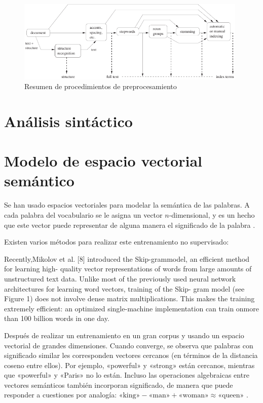 \begin{figure}[H]
\includegraphics[width=0.98\textwidth]{procesamiento-textos-mod-ir}
\caption[Resumen de procedimientos de preprocesamiento]{Resumen de procedimientos de preprocesamiento \citep[ch. 7]{Baeza-Yates2011}}
\end{figure}

\section{Análisis sintáctico}

\section{Modelo de espacio vectorial semántico}

Se han usado espacios vectoriales para modelar la semántica de las palabras. A cada palabra del vocabulario se le asigna un vector $n$-dimensional, y es un hecho que este vector puede representar de alguna manera el significado de la palabra \citep{Socher2012}.

Existen varios métodos para realizar este entrenamiento no supervisado:
\begin{description}
\item[]
\end{description}
Recently,Mikolov et al. [8] introduced the Skip-grammodel, an efficient method for learning high- quality vector representations of words from large amounts of unstructured text data. Unlike most of the previously used neural network architectures for learning word vectors, training of the Skip- gram model (see Figure 1) does not involve dense matrix multiplications. This makes the training extremely efficient: an optimized single-machine implementation can train onmore than 100 billion words in one day.


Después de realizar un entrenamiento en un gran corpus y usando un espacio vectorial de grandes dimensiones. Cuando converge, se observa que palabras con significado similar les corresponden vectores cercanos (en términos de la distancia coseno entre ellos). Por ejemplo, «powerful» y «strong» están cercanos, mientras que «powerful» y «Paris» no lo están. Incluso las operaciones algebraicas entre vectores semánticos también incorporan significado, de manera que puede responder a cuestiones por analogía:
$\text{«king»} - \text{«man»} + \text{«woman»} \approx \text{«queen»}$
\citep{DBLP:journals/corr/LeM14}.
